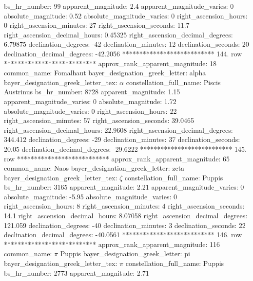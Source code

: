                       bs_hr_number: 99
                apparent_magnitude: 2.4
         apparent_magnitude_varies: 0
                absolute_magnitude: 0.52
         absolute_magnitude_varies: 0
             right_ascension_hours: 0
           right_ascension_minutes: 27
           right_ascension_seconds: 11.7
     right_ascension_decimal_hours: 0.45325
   right_ascension_decimal_degrees: 6.79875
               declination_degrees: -42
               declination_minutes: 12
               declination_seconds: 20
       declination_decimal_degrees: -42.2056
*************************** 144. row ***************************
    approx_rank_apparent_magnitude: 18
                       common_name: Fomalhaut
    bayer_designation_greek_letter: alpha
bayer_designation_greek_letter_tex: $\alpha$
           constellation_full_name: Piscis Austrinus
                      bs_hr_number: 8728
                apparent_magnitude: 1.15
         apparent_magnitude_varies: 0
                absolute_magnitude: 1.72
         absolute_magnitude_varies: 0
             right_ascension_hours: 22
           right_ascension_minutes: 57
           right_ascension_seconds: 39.0465
     right_ascension_decimal_hours: 22.9608
   right_ascension_decimal_degrees: 344.412
               declination_degrees: -29
               declination_minutes: 37
               declination_seconds: 20.05
       declination_decimal_degrees: -29.6222
*************************** 145. row ***************************
    approx_rank_apparent_magnitude: 65
                       common_name: Naos
    bayer_designation_greek_letter: zeta
bayer_designation_greek_letter_tex: $\zeta$
           constellation_full_name: Puppis
                      bs_hr_number: 3165
                apparent_magnitude: 2.21
         apparent_magnitude_varies: 0
                absolute_magnitude: -5.95
         absolute_magnitude_varies: 0
             right_ascension_hours: 8
           right_ascension_minutes: 4
           right_ascension_seconds: 14.1
     right_ascension_decimal_hours: 8.07058
   right_ascension_decimal_degrees: 121.059
               declination_degrees: -40
               declination_minutes: 3
               declination_seconds: 22
       declination_decimal_degrees: -40.0561
*************************** 146. row ***************************
    approx_rank_apparent_magnitude: 116
                       common_name: $\pi$ Puppis
    bayer_designation_greek_letter: pi
bayer_designation_greek_letter_tex: $\pi$
           constellation_full_name: Puppis
                      bs_hr_number: 2773
                apparent_magnitude: 2.71
